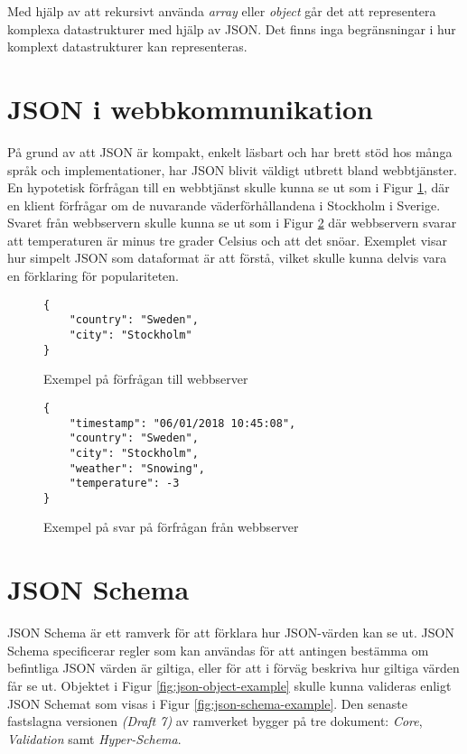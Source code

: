 \noindent
Med hjälp av att rekursivt använda \textit{array} eller \textit{object} går det att representera komplexa datastrukturer med hjälp av JSON. Det finns inga begränsningar i hur komplext datastrukturer kan representeras.

\section{JSON i webbkommunikation}
\label{sec:teori:json-web}
På grund av att JSON är kompakt, enkelt läsbart och har brett stöd hos många språk och implementationer, har JSON blivit väldigt utbrett bland webbtjänster. En hypotetisk förfrågan till en webbtjänst skulle kunna se ut som i Figur \ref{fig:json-request-example}, där en klient förfrågar om de nuvarande väderförhållandena i Stockholm i Sverige. Svaret från webbservern skulle kunna se ut som i Figur \ref{fig:json-response-example} där webbservern svarar att temperaturen är minus tre grader Celsius och att det snöar. Exemplet visar hur simpelt JSON som dataformat är att förstå, vilket skulle kunna delvis vara en förklaring för populariteten.

\begin{figure}
	\begin{verbatim}
{
	"country": "Sweden",
	"city": "Stockholm"
}
\end{verbatim}
	\vspace{-1.7em}
	\caption{Exempel på förfrågan till webbserver}
	\label{fig:json-request-example}
\end{figure}

\begin{figure}
	\begin{verbatim}
{
	"timestamp": "06/01/2018 10:45:08",
	"country": "Sweden",
	"city": "Stockholm",
	"weather": "Snowing",
	"temperature": -3
}
	\end{verbatim}
	\vspace{-1.7em}
	\caption{Exempel på svar på förfrågan från webbserver}
	\label{fig:json-response-example}
\end{figure}

\section{JSON Schema}
\label{sec:teori:schema}
JSON Schema är ett ramverk för att förklara hur JSON-värden kan se ut. JSON Schema specificerar regler som kan användas för att antingen bestämma om befintliga JSON värden är giltiga, eller för att i förväg beskriva hur giltiga värden får se ut. Objektet i Figur \ref{fig:json-object-example} skulle kunna valideras enligt JSON Schemat som visas i Figur \ref{fig:json-schema-example}. Den senaste fastslagna versionen \textit{(Draft 7)} av ramverket bygger på tre dokument: \textit{Core}, \textit{Validation} samt \textit{Hyper-Schema}. \cite{A.Wright,Andrews2018,Andrews2018a}

